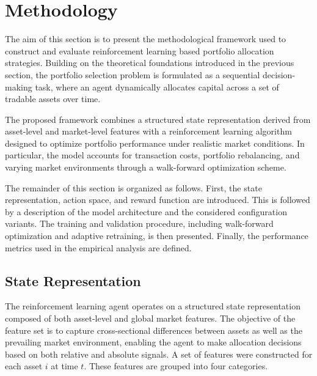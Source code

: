\documentclass[]{elsarticle}
\begin{document}
\hypertarget{methodology}{%
\section{Methodology}\label{methodology}}

The aim of this section is to present the methodological framework used to construct and evaluate reinforcement learning based portfolio allocation strategies. Building on the theoretical foundations introduced in the previous section, the portfolio selection problem is formulated as a sequential decision-making task, where an agent dynamically allocates capital across a set of tradable assets over time.

The proposed framework combines a structured state representation derived from asset-level and market-level features with a reinforcement learning algorithm designed to optimize portfolio performance under realistic market conditions. In particular, the model accounts for transaction costs, portfolio rebalancing, and varying market environments through a walk-forward optimization scheme.

The remainder of this section is organized as follows. First, the state representation, action space, and reward function are introduced. This is followed by a description of the model architecture and the considered configuration variants. The training and validation procedure, including walk-forward optimization and adaptive retraining, is then presented. Finally, the performance metrics used in the empirical analysis are defined.

\hypertarget{State_Representation}{%
\subsection{State Representation}\label{State_Representation}}

The reinforcement learning agent operates on a structured state representation composed of both asset-level and global market features. The objective of the feature set is to capture cross-sectional differences between assets as well as the prevailing market environment, enabling the agent to make allocation decisions based on both relative and absolute signals. A set of features were constructed for each asset \(i\) at time \(t\). These features are grouped into four categories.
\end{document}
